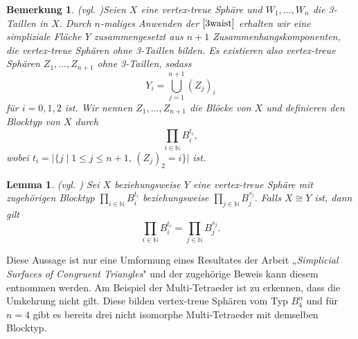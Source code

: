 \documentclass[12pt,titlepage,twoside,cleardoublepage]{article}
\theoremstyle{nummermitklammern}
\newtheorem{lemma}[temp]{Lemma}
\newtheorem{bemerkung}[temp]{Bemerkung}
\newtheorem{lemma}[zahl]{Lemma}
\newtheorem{bemerkung}[zahl]{Bemerkung}
\numberwithin{equation}{section}
\begin{document}
\begin{bemerkung}{\textsc{(}vgl. \textsc{\cite{simp})}}\label{block}
Seien $X$ eine vertex-treue Sphäre und $W_1,\ldots,W_n$ die 3-Taillen in $X.$ Durch  $n$-maliges Anwenden der $\Cref{3waist}$ erhalten wir eine simpliziale Fläche $Y$ zusammengesetzt aus $n+1$ Zusammenhangskomponenten, die vertex-treue Sphären ohne 3-Taillen bilden. Es existieren also vertex-treue Sphären $Z_1,\ldots,Z_{n+1}$ ohne 3-Taillen, sodass
\[
Y_i=\bigcup_{j=1}^{n+1}(Z_j)_i 
\]
für $i=0,1,2$ ist. Wir nennen $Z_1,\ldots,Z_{n+1}$ die \emph{Blöcke} von $X$ und definieren den \emph{Blocktyp} von $X$ durch 
\[
\prod_{i\in \mathbb{N}} B_i^{t_i},
\]
wobei $t_i=\vert\{j \mid 1\leq j\leq n+1,\,(Z_j)_2=i\}\vert$ ist.
\end{bemerkung}
\begin{lemma}{\textsc{(}vgl. \textsc{\cite{simp})}}
Sei $X$ beziehungsweise $Y$ eine vertex-treue Sphäre mit zugehörigen Blocktyp $\underset{i\in \mathbb{N}}{\prod} B_i^{t_i}$ beziehungsweise $\underset{j\in \mathbb{N}}{\prod} B_j^{s_j}.$ Falls $X\cong Y$ ist, dann gilt 
\[
\prod_{i\in \mathbb{N}} B_i^{t_i}=\prod_{j\in \mathbb{N}} B_{j}^{s_j}.
\]  
\end{lemma}
Diese Aussage ist nur eine Umformung eines Resultates der Arbeit „\emph{Simplicial Surfaces of Congruent Triangles}"$ $ und der zugehörige Beweis kann diesem entnommen werden. Am Beispiel der Multi-Tetraeder ist zu erkennen, dass die Umkehrung nicht gilt. Diese bilden vertex-treue Sphären vom Typ $B_4^n$ und für $n=4$ gibt es bereits drei nicht isomorphe Multi-Tetraeder mit demselben Blocktyp.
\end{document}
